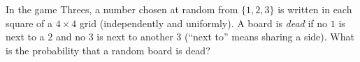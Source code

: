 In the game Threes, a number chosen at random from $\{1,2,3\}$ is written in each square of a $4\times4$ grid (independently and uniformly). A board is \emph{dead} if no $1$ is next to a $2$ and no $3$ is next to another $3$ (``next to'' means sharing a side). What is the probability that a random board is dead?
